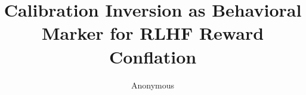 \documentclass[letterpaper]{article}
\title{Calibration Inversion as Behavioral Marker for RLHF Reward Conflation}
\author{Anonymous}
\date{}
\begin{document}
\maketitle

\begin{abstract}

\end{abstract}











\end{document}
